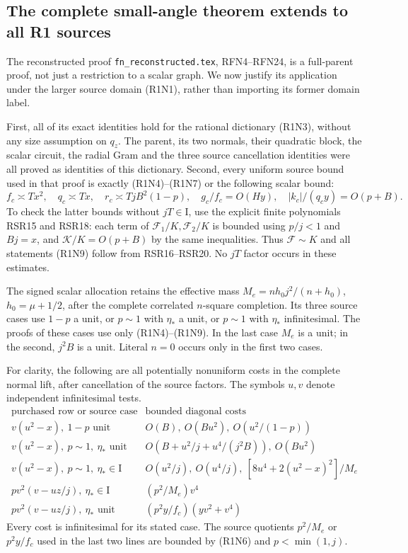 \subsection{The complete small-angle theorem extends to all R1 sources}

The reconstructed proof \texttt{fn\_reconstructed.tex}, RFN4--RFN24,
is a full-parent proof, not just a restriction to a scalar graph.
We now justify its application under the larger source domain
(R1N1), rather than importing its former domain label.

First, all of its exact identities hold for the rational dictionary
(R1N3), without any size assumption on $q_z$.  The parent, its two
normals, their quadratic block, the scalar circuit, the radial Gram
and the three source cancellation identities were all proved as
identities of this dictionary.  Second, every uniform source bound
used in that proof is exactly (R1N4)--(R1N7) or the following scalar
bound:
\[
 f_c\asymp Tx^2,\quad q_c\asymp Tx,\quad
 r_c\asymp TjB^2(1-p),\quad
 g_c/f_c=O(Hy),\quad |k_c|/(q_cy)=O(p+B).                \tag{R1N9}
\]
To check the latter bounds without $jT\in\mathrm I$, use the explicit
finite polynomials RSR15 and RSR18: each term of
$\mathcal F_1/K,\mathcal F_2/K$ is bounded using $p/j<1$
and $Bj=x$, and $\mathcal K/K=O(p+B)$ by the same inequalities.
Thus $\mathcal F\sim K$ and all statements (R1N9) follow from
RSR16--RSR20.  No $jT$ factor occurs in these estimates.

The signed scalar allocation retains the effective mass
$M_e=nh_0j^2/(n+h_0)$, $h_0=\mu+1/2$, after the complete
correlated $n$-square completion.  Its three source cases use
$1-p$ a unit, or $p\sim1$ with $\eta_*$ a unit, or
$p\sim1$ with $\eta_*$ infinitesimal.  The proofs of these cases use
only (R1N4)--(R1N9).  In the last case $M_e$ is a unit; in the second,
$j^2B$ is a unit.  Literal $n=0$ occurs only in the first two cases.

For clarity, the following are all potentially nonuniform costs in
the complete normal lift, after cancellation of the source factors.
The symbols $u,v$ denote independent infinitesimal tests.
\[
\begin{array}{c|c}
 \text{purchased row or source case}&\text{bounded diagonal costs}\\ \hline
 v(u^2-x),\ 1-p\text{ unit}
       &O(B),\ O(Bu^2),\ O(u^2/(1-p))\\
 v(u^2-x),\ p\sim1,\ \eta_*\text{ unit}
       &O(B+u^2/j+u^4/(j^2B)),\ O(Bu^2)\\
 v(u^2-x),\ p\sim1,\ \eta_*\in\mathrm I
       &O(u^2/j),\ O(u^4/j),\
            [8u^4+2(u^2-x)^2]/M_e\\
 pv^2(v-uz/j),\ \eta_*\in\mathrm I
       &(p^2/M_e)v^4\\
 pv^2(v-uz/j),\ \eta_*\text{ unit}
       &(p^2y/f_c)(yv^2+v^4)
\end{array}                                                   \tag{R1N10}
\]
Every cost is infinitesimal for its stated case.  The source quotients
$p^2/M_e$ or $p^2y/f_c$ used in the last two lines are bounded by
(R1N6) and $p<\min(1,j)$.

